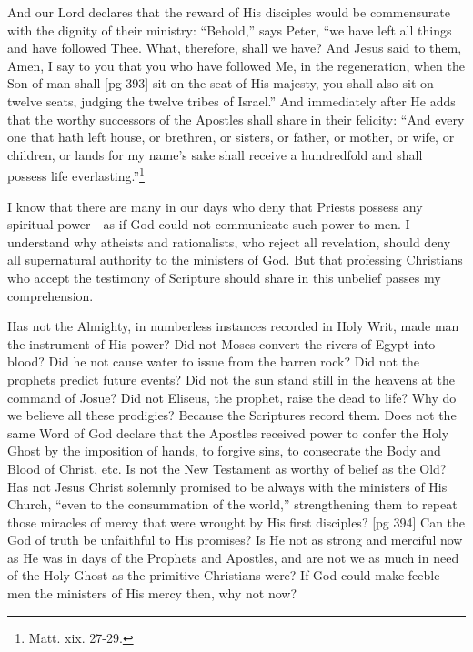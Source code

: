 And our Lord declares that the reward of His
disciples would be commensurate with the dignity
of their ministry: “Behold,” says Peter, “we
have left all things and have followed Thee. What,
therefore, shall we have? And Jesus said to them,
Amen, I say to you that you who have followed
Me, in the regeneration, when the Son of man shall
[pg 393]
sit on the seat of His majesty, you shall also sit
on twelve seats, judging the twelve tribes of
Israel.” And immediately after He adds that
the worthy successors of the Apostles shall share
in their felicity: “And every one that hath left
house, or brethren, or sisters, or father, or mother,
or wife, or children, or lands for my name's sake
shall receive a hundredfold and shall possess life
everlasting.”\footnote{Matt. xix. 27-29.}

I know that there are many in our days who
deny that Priests possess any spiritual power—as
if God could not communicate such power to
men. I understand why atheists and rationalists,
who reject all revelation, should deny all supernatural
authority to the ministers of God. But
that professing Christians who accept the testimony
of Scripture should share in this unbelief
passes my comprehension.

Has not the Almighty, in numberless instances
recorded in Holy Writ, made man the instrument
of His power? Did not Moses convert the rivers
of Egypt into blood? Did he not cause water to
issue from the barren rock? Did not the prophets
predict future events? Did not the sun stand still
in the heavens at the command of Josue? Did not
Eliseus, the prophet, raise the dead to life? Why
do we believe all these prodigies? Because the
Scriptures record them. Does not the same Word
of God declare that the Apostles received power
to confer the Holy Ghost by the imposition of
hands, to forgive sins, to consecrate the Body and
Blood of Christ, etc. Is not the New Testament as
worthy of belief as the Old? Has not Jesus Christ
solemnly promised to be always with the ministers
of His Church, “even to the consummation of the
world,” strengthening them to repeat those miracles
of mercy that were wrought by His first disciples?
[pg 394]
Can the God of truth be unfaithful to
His promises? Is He not as strong and merciful
now as He was in days of the Prophets and Apostles,
and are not we as much in need of the Holy
Ghost as the primitive Christians were? If God
could make feeble men the ministers of His mercy
then, why not now?

